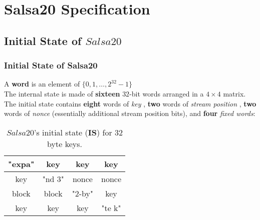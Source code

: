 \section{Salsa20 Specification}
\subsection{Initial State of $Salsa20$}

\begin{frame}
\frametitle{Initial State of Salsa20}
A \textbf{word} is an element of $\{0,1,\ldots,2^{32} - 1\}$ \\
 The internal state is made of \textbf{sixteen} $32$-bit words arranged in a $4 \times 4$ matrix. The initial state contains \textbf{eight} words of \textit{key} , \textbf{two} words of \textit{stream position} , \textbf{two} words of \textit{nonce} (essentially additional stream position bits), and \textbf{four} \textit{fixed words}:\\
\begin{table}[h!]
\begin{center}
\begin{tabular}{ ||c||c||c||c|| } 
\hline
\hline
"expa" & key & key & key\\
\hline
\hline
key & "nd 3"  & nonce & nonce\\
\hline
\hline
block & block & "2-by" & key\\
\hline
\hline
key & key & key & "te k"\\
\hline
\hline
\end{tabular}

\end{center}
\caption{$Salsa20$'s initial state (\textbf{IS}) for $32$ byte keys.}
\end{table}
\end{frame}